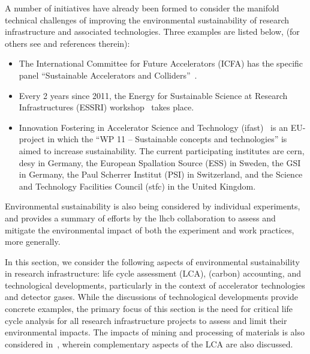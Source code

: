\documentclass[../SustainableHEP.tex]{subfiles}
\begin{document}
A number of initiatives have already been formed to consider the manifold technical challenges of improving the environmental sustainability of research infrastructure and associated technologies. Three examples are listed below, (for others see  and references therein):
\begin{itemize}

    \item The International Committee for Future Accelerators (ICFA) has the specific panel ``Sustainable Accelerators and Colliders''~\cite{SustainableAcceleratorsICFA}.
    
    \item Every 2 years since 2011, the Energy for Sustainable Science at Research Infrastructures (ESSRI) workshop~\cite{ESSRI5} takes place.
    
    \item Innovation Fostering in Accelerator Science and Technology (\acrshort{ifast})~\cite{IFAST} is an EU-project in which the “WP 11 – Sustainable concepts and technologies” is aimed to increase sustainability. The current participating institutes are \acrshort{cern}, \acrshort{desy} in Germany, the European Spallation Source (ESS) in Sweden, the GSI in Germany, the Paul Scherrer Institut (PSI) in Switzerland, and the Science and Technology Facilities Council (\acrshort{stfc}) in the United Kingdom.

\end{itemize}
Environmental sustainability is also being considered by individual experiments, and  provides a summary of efforts by the \acrshort{lhcb} collaboration to assess and mitigate the environmental impact of both the experiment and work practices, more generally.

In this section, we consider the following aspects of environmental sustainability in research infrastructure: life cycle assessment (LCA), (carbon) accounting, and technological developments, particularly in the context of accelerator technologies and detector gases. While the discussions of technological developments provide concrete examples, the primary focus of this section is the need for critical life cycle analysis for all research infrastructure projects to assess and limit their environmental impacts. The impacts of mining and processing of materials is also considered in~, wherein complementary aspects of the LCA are also discussed.
\end{document}
